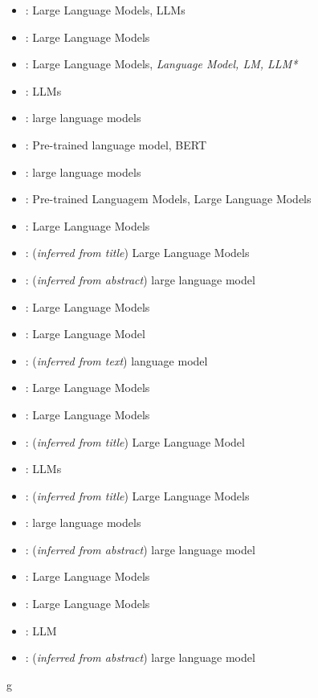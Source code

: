 \documentclass[a4paper,colorinlistoftodos]{article}
\begin{document}
\begin{itemize}
  \item \citet{babaei2023Llms4olLargeLanguage}: Large Language Models, LLMs
  \item \citet{babaei2025Llms4omMatchingOntologies}: Large Language Models
  \item \citet{li2025LargeLanguageModels}: Large Language Models,
    \textit{Language Model, LM, LLM*}
  \item \citet{mai2024DoLlmsReally}: LLMs
  \item \citet{bakker2024OntologyLearningText}: large language models
  \item \citet{chen2023ContextualSemanticEmbeddings}: Pre-trained language
    model, BERT
  \item \citet{chen2023PromptingOrFine}: large language models
  \item \citet{dong2024LanguageModelBased}: Pre-trained Languagem Models,
    Large Language Models
  \item \citet{doumanas2024IntegratingLlmsIn}: Large Language Models
  \item \citet{du2024ShortReviewOntology}: (\textit{inferred from title})
    Large Language Models 
  \item \citet{funk2023TowardsOntologyConstruction}: (\textit{inferred from
      abstract}) large language model
  \item \citet{garijo2024LlmsOntologyEngineering}: Large Language Models
  \item \citet{he2023ExploringLargeLanguage}: Large Language Model
  \item \citet{jain2022DistillingHypernymyRelations}: (\textit{inferred from
      text}) language model
  \item \citet{kommineni2024HumanExpertsMachines}: Large Language Models
  \item \citet{lippolis2025OntologyGenerationUsing}: Large Language Models
  \item \citet{lo2024EndEndOntology}: (\textit{inferred from title}) Large
    Language Model
  \item \citet{mai2024DoLlmsReally}: LLMs
  \item \citet{mateiu2023OntologyEngineeringWith}: (\textit{inferred from
      title}) Large Language Models
  \item \citet{norouzi2024OntologyPopulationUsing}: large language models
  \item \citet{snijder2024AdvancingOntologyAlignment}: (\textit{inferred from
      abstract}) large language model
  \item \citet{fathallah2024NeonGptLarge}: Large Language Models
  \item \citet{tsaneva2024LlmDrivenOntology}: Large Language Models
  \item \citet{yang2024LlmSupportedApproach}: LLM
  \item \citet{zeginis2024ApplyingOntologyAware}: (\textit{inferred from
      abstract}) large language model
\end{itemize}

g


\end{document}

